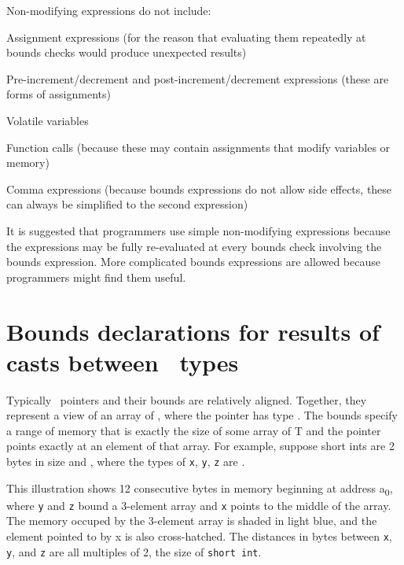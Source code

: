 Non-modifying expressions do not include:

\begin{compactitem}
\item
  Assignment expressions (for the reason that evaluating them repeatedly
  at bounds checks would produce unexpected results)
\item
  Pre-increment/decrement and post-increment/decrement expressions
  (these are forms of assignments)
\item
  Volatile variables
\item
  Function calls (because these may contain assignments that modify
  variables or memory)
\item
  Comma expressions (because bounds expressions do not allow side
  effects, these can always be simplified to the second expression)
\end{compactitem}

It is suggested that programmers use simple non-modifying expressions because
the expressions may be fully re-evaluated at every bounds check involving the
bounds expression. More complicated bounds expressions are allowed
because programmers might find them useful.

\section{Bounds declarations for results of casts between \arrayptr\ types}
\label{section:pointer-cast-results}

Typically \arrayptr\ pointers and their bounds are relatively
aligned. Together, they represent a view of an array of , where
the pointer has type
\arrayptrT. The
bounds specify a range of memory that is exactly the size of some array
of T and the pointer points exactly at an element of that array. For
example, suppose short ints are 2 bytes in size and 
{\texttt{}}, where the types of \texttt{x},
\texttt{y}, \texttt{z} are  .

This illustration shows 12 consecutive bytes in memory beginning at
address a\textsubscript{0}, where \texttt{y} and \texttt{z} bound a
3-element array and \texttt{x} points to the middle of the array. The
memory occuped by the 3-element array is shaded in light blue, and the
element pointed to by x is also cross-hatched. The distances in bytes
between \texttt{x}, \texttt{y}, and \texttt{z} are all multiples of 2,
the size of \texttt{short int}.
\begin{center}
\end{center}

